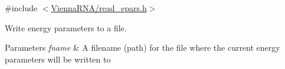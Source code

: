 {\ttfamily \#include $<$\hyperlink{read__epars_8h}{Vienna\+R\+N\+A/read\+\_\+epars.\+h}$>$}



Write energy parameters to a file. 


\begin{DoxyParams}{Parameters}
{\em fname} & A filename (path) for the file where the current energy parameters will be written to \\
\hline
\end{DoxyParams}
